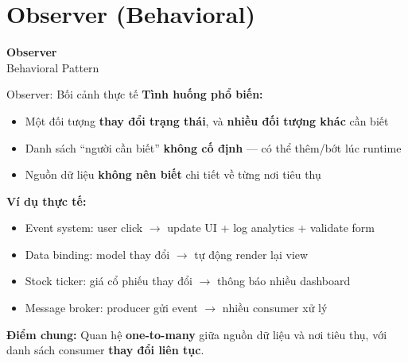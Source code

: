 \section{Observer (Behavioral)}

\begin{frame}
  \begin{center}
    \Huge\textbf{Observer}\\[0.5em]
    \Large\textcolor{mypurple}{Behavioral Pattern}
  \end{center}
\end{frame}

\begin{frame}{Observer: Bối cảnh thực tế}
  \textbf{Tình huống phổ biến:}
  \begin{itemize}
    \item Một đối tượng \textbf{thay đổi trạng thái}, và \textbf{nhiều đối tượng khác} cần biết
    \item Danh sách ``người cần biết'' \textbf{không cố định} --- có thể thêm/bớt lúc runtime
    \item Nguồn dữ liệu \textbf{không nên biết} chi tiết về từng nơi tiêu thụ
  \end{itemize}

  \vspace{0.5em}
  \textbf{Ví dụ thực tế:}
  \begin{itemize}
    \item \textcolor{myblue}{Event system}: user click $\rightarrow$ update UI + log analytics + validate form
    \item \textcolor{myblue}{Data binding}: model thay đổi $\rightarrow$ tự động render lại view
    \item \textcolor{myblue}{Stock ticker}: giá cổ phiếu thay đổi $\rightarrow$ thông báo nhiều dashboard
    \item \textcolor{myblue}{Message broker}: producer gửi event $\rightarrow$ nhiều consumer xử lý
  \end{itemize}

  \vspace{0.5em}
  \textcolor{myred}{\textbf{Điểm chung:}} Quan hệ \textbf{one-to-many} giữa nguồn dữ liệu và nơi tiêu thụ,
  với danh sách consumer \textbf{thay đổi liên tục}.
\end{frame}

